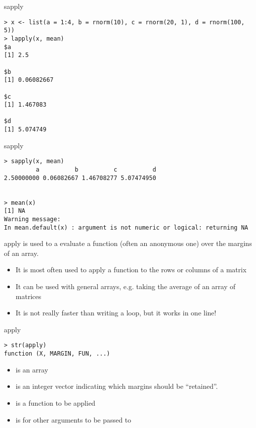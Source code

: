 \documentclass[aspectratio=169]{beamer}
\begin{document}
\begin{frame}[fragile]{sapply}
\begin{verbatim}
> x <- list(a = 1:4, b = rnorm(10), c = rnorm(20, 1), d = rnorm(100, 5))
> lapply(x, mean)
$a
[1] 2.5

$b
[1] 0.06082667

$c
[1] 1.467083

$d
[1] 5.074749
\end{verbatim}
\end{frame}

\begin{frame}[fragile]{sapply}
\begin{verbatim}
> sapply(x, mean)
         a          b          c          d 
2.50000000 0.06082667 1.46708277 5.07474950


> mean(x)
[1] NA
Warning message:
In mean.default(x) : argument is not numeric or logical: returning NA
\end{verbatim}
\end{frame}

\begin{frame}[fragile]{apply}
 is used to a evaluate a function (often an anonymous one)
over the margins of an array.
\begin{itemize}
\item
It is most often used to apply a function to the rows or columns of a matrix
\item
It can be used with general arrays, e.g. taking the average of an
array of matrices
\item
It is not really faster than writing a loop, but it works in one line!
\end{itemize}
\end{frame}


\begin{frame}[fragile]{apply}
\begin{verbatim}
> str(apply)
function (X, MARGIN, FUN, ...)  
\end{verbatim}
\begin{itemize}
\item
{} is an array
\item
{} is an integer vector indicating which margins should be
``retained''.
\item
{} is a function to be applied
\item
{} is for other arguments to be passed to 
\end{itemize}
\end{frame}
\end{document}
